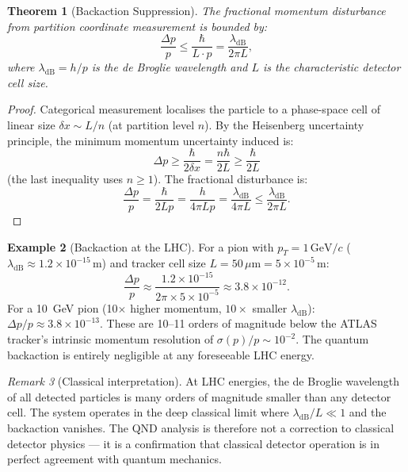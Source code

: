 \documentclass[twocolumn,10pt,a4paper]{article}
\theoremstyle{thmstyle}
\newtheorem{theorem}{Theorem}[section]
\theoremstyle{definition}
\newtheorem{example}[theorem]{Example}
\theoremstyle{remark}
\newtheorem{remark}[theorem]{Remark}
\begin{document}
\begin{theorem}[Backaction Suppression]
\label{thm:backaction}
The fractional momentum disturbance from partition coordinate measurement
is bounded by:
\begin{equation}
\frac{\Delta p}{p} \leq \frac{\hbar}{L \cdot p}
= \frac{\lambda_{\mathrm{dB}}}{2\pi L},
\label{eq:backaction}
\end{equation}
where $\lambda_{\mathrm{dB}} = h/p$ is the de Broglie wavelength and
$L$ is the characteristic detector cell size.
\end{theorem}

\begin{proof}
Categorical measurement localises the particle to a phase-space cell of
linear size $\delta x \sim L/n$ (at partition level $n$). By the Heisenberg
uncertainty principle, the minimum momentum uncertainty induced is:
\[
\Delta p \geq \frac{\hbar}{2\delta x} = \frac{n\hbar}{2L}
\geq \frac{\hbar}{2L}
\]
(the last inequality uses $n \geq 1$). The fractional disturbance is:
\[
\frac{\Delta p}{p} = \frac{\hbar}{2Lp} = \frac{h}{4\pi Lp}
= \frac{\lambda_{\mathrm{dB}}}{4\pi L} \leq \frac{\lambda_{\mathrm{dB}}}{2\pi L}.
\]
\end{proof}

\begin{example}[Backaction at the LHC]
For a pion with $p_T = 1\,\mathrm{GeV}/c$ ($\lambda_{\mathrm{dB}} \approx 1.2\times 10^{-15}\,\mathrm{m}$)
and tracker cell size $L = 50\,\mu\mathrm{m} = 5\times 10^{-5}\,\mathrm{m}$:
\[
\frac{\Delta p}{p} \approx \frac{1.2\times 10^{-15}}{2\pi \times 5\times 10^{-5}}
\approx 3.8 \times 10^{-12}.
\]
For a 10~GeV pion (10$\times$ higher momentum, $10\times$ smaller $\lambda_{\mathrm{dB}}$):
$\Delta p/p \approx 3.8 \times 10^{-13}$.
These are 10--11 orders of magnitude below the ATLAS tracker's
intrinsic momentum resolution of $\sigma(p)/p \sim 10^{-2}$.
The quantum backaction is entirely negligible at any foreseeable LHC energy.
\end{example}

\begin{remark}[Classical interpretation]
At LHC energies, the de Broglie wavelength of all detected particles
is many orders of magnitude smaller than any detector cell. The system
operates in the deep classical limit where $\lambda_{\mathrm{dB}}/L \ll 1$
and the backaction vanishes. The QND analysis is therefore not a
correction to classical detector physics — it is a confirmation that
classical detector operation is in perfect agreement with quantum mechanics.
\end{remark}
\end{document}
